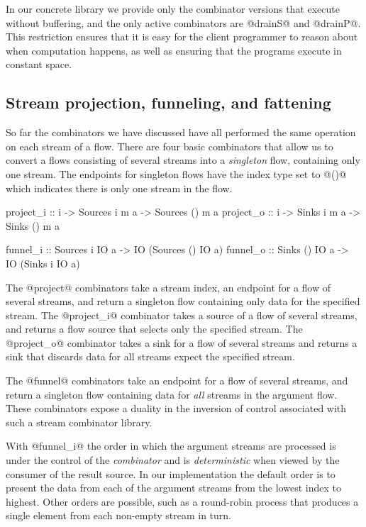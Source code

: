 In our concrete library we provide only the combinator versions that execute without buffering, and the only active combinators are @drainS@ and @drainP@. This restriction ensures that it is easy for the client programmer to reason about when computation happens, as well as ensuring that the programs execute in constant space.


\subsection{Stream projection, funneling, and fattening}
So far the combinators we have discussed have all performed the same operation on each stream of a flow. There are four basic combinators that allow us to convert a flows consisting of several streams into a \emph{singleton} flow, containing only one stream. The endpoints for singleton flows have the index type set to @()@ which indicates there is only one stream in the flow.
\begin{code}
project_i :: i -> Sources i m a -> Sources () m a
project_o :: i -> Sinks   i m a -> Sinks   () m a

funnel_i  :: Sources i IO a -> IO (Sources () IO a)
funnel_o  :: Sinks  () IO a -> IO (Sinks   i  IO a)
\end{code}

The @project@ combinators take a stream index, an endpoint for a flow of several streams, and return a singleton flow containing only data for the specified stream. The @project_i@ combinator takes a source of a flow of several streams, and returns a flow source that selects only the specified stream. The @project_o@ combinator takes a sink for a flow of several streams and returns a sink that discards data for all streams expect the specified stream.

The @funnel@ combinators take an endpoint for a flow of several streams, and return a singleton flow containing data for \emph{all} streams in the argument flow. These combinators expose a duality in the inversion of control associated with such a stream combinator library. 

With @funnel_i@ the order in which the argument streams are processed is under the control of the \emph{combinator} and is \emph{deterministic} when viewed by the consumer of the result source. In our implementation the default order is to present the data from each of the argument streams from the lowest index to highest. Other orders are possible, such as a round-robin process that produces a single element from each non-empty stream in turn. 

